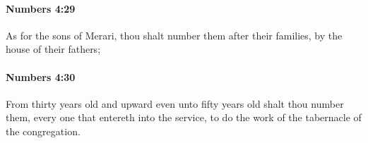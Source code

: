 		\paragraph{Numbers 4:29} %
			\label{NUMBERS-4-29}

			As for the sons of Merari, thou shalt number them after their families, by the house of their fathers;


		\paragraph{Numbers 4:30} %
			\label{NUMBERS-4-30}

			From thirty years old and upward even unto fifty years old shalt thou number them, every one that entereth into the service, to do the work of the tabernacle of the congregation.


